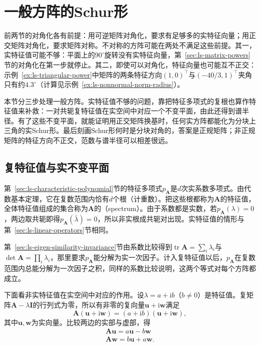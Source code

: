 
\section{一般方阵的Schur形}
\label{sec:ls-general-square-spectrum}

前两节的对角化各有前提：用可逆矩阵对角化，要求有足够多的实特征向量；用正交矩阵对角化，要求矩阵对称。不对称的方阵可能在两处不满足这些前提。其一，实特征值可能不够：平面上的$90^\circ$旋转没有实特征向量，第~\ref{sec:ls-matrix-powers}节的对角化在第一步就停止。其二，即使可以对角化，特征向量也可能互不正交：示例~\ref{ex:ls-triangular-power}中矩阵的两条特征方向$(1,0)^\top$与$(-40/3,1)^\top$夹角只有约$4.3^\circ$（计算见示例~\ref{ex:ls-nonnormal-norm-radius}）。

本节分三步处理一般方阵。实特征值不够的问题，靠把特征多项式的复根也算作特征值来补救：一对共轭复特征值在实空间中对应一个不变平面，由此还得到谱半径。有了这些不变平面，就能证明用正交矩阵换基时，任何实方阵都能化为分块上三角的实Schur形。最后刻画Schur形何时是分块对角的，答案是正规矩阵；非正规矩阵的特征方向不正交，范数与谱半径可以相差很远。

\subsection{复特征值与实不变平面}

第~\ref{sec:ls-characteristic-polynomial}节的特征多项式$p_{\bm A}$是$d$次实系数多项式。由代数基本定理，它在复数范围内恰有$d$个根（计重数）。把这些根都称为$\bm A$的特征值，全体特征值组成的集合称为$\bm A$的（spectrum）。由于系数都是实数，若$p_{\bm A}(\lambda)=0$，两边取共轭即得$p_{\bm A}(\bar\lambda)=0$，所以非实根成共轭对出现。实特征值的情形与第~\ref{sec:ls-linear-operators}节相同。

第~\ref{sec:ls-eigen-similarity-invariance}节由系数比较得到$\operatorname{tr}\bm A=\sum_i\lambda_i$与$\det\bm A=\prod_i\lambda_i$，那里要求$p_{\bm A}$能分解为实一次因子。计入复特征值以后，$p_{\bm A}$在复数范围内总能分解为一次因子之积，同样的系数比较说明，这两个等式对每个方阵都成立。

下面看非实特征值在实空间中对应的作用。设$\lambda=a+\mathrm ib$（$b\neq0$）是特征值。复矩阵$\bm A-\lambda\bm I$的行列式为零，所以有非零的复向量$\bm u+\mathrm i\bm w$满足
\[
 \bm A(\bm u+\mathrm i\bm w)=(a+\mathrm ib)(\bm u+\mathrm i\bm w),
\]
其中$\bm u,\bm w$为实向量。比较两边的实部与虚部，得
\[
 \begin{gathered}
\bm A\bm u=a\bm u-b\bm w\\
\bm A\bm w=b\bm u+a\bm w .
 \end{gathered}
\]

